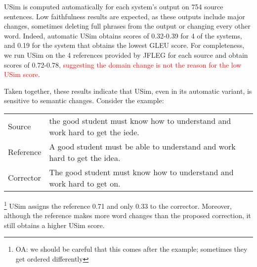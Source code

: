 \documentclass[a4paper, 11pt]{article}
\newcommand{\oa}[1]{\footnote{\color{red}OA: #1}}
\begin{document}
{\sc USim} is computed automatically for each system's output on 754 source sentences.
Low faithfulness results are expected, as these outputs include major changes,
sometimes deleting full phrases from the output or changing every other word.
Indeed, automatic {\sc USim} obtains scores of 0.32-0.39 for 4 of the systems, and 0.19
for the system that obtains the lowest GLEU \cite{napoles2015ground} score.
For completeness, we run {\sc USim} on the 4 references provided by JFLEG for each
source and obtain scores of 0.72-0.78, \textcolor{red}{suggesting the domain change is not the reason for the low {\sc USim} score}.

Taken together, these results indicate that {\sc USim}, even in its automatic variant,
is sensitive to semantic changes. Consider the example: 

\begin{table}[h!]
  \centering
  \label{ex:sensitive}
  \begin{tabular}{p{}p{}}
    Source    & \small the good student must know how to understand and work hard to get the iede.\\
    Reference & \small A good student must be able to understand and work hard to get the idea.\\
    Corrector & \small The good student must know how to understand and work hard to get on.     
  \end{tabular}
  
\end{table}

\oa{we should be careful that this comes after the example; sometimes they get ordered differently}
{\sc USim} assigns the reference 0.71 and only 0.33 to the corrector.
Moreover, although the reference makes more word changes than the proposed correction,
it still obtains a higher {\sc USim} score.


%
%
%
\end{document}
